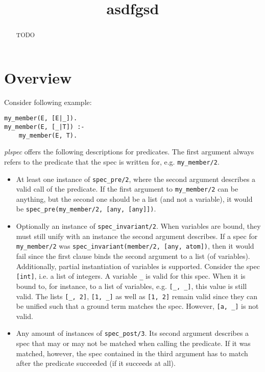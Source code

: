 \documentclass{article}
\title{asdfgsd}
\begin{document}
\maketitle

\begin{abstract}
TODO
\end{abstract}

\section{Overview}

Consider following example:

\begin{verbatim}
my_member(E, [E|_]).
my_member(E, [_|T]) :-
    my_member(E, T).
\end{verbatim}

\emph{plspec} offers the following descriptions for predicates.
The first argument always refers to the predicate that the spec is written for,
e.g. \verb|my_member/2|.

\begin{itemize}
    \item
        At least one instance of \verb|spec_pre/2|,
        where the second argument describes a valid call of the predicate.
        If the first argument to \verb|my_member/2| can be anything,
        but the second one should be a list (and not a variable),
        it would be \verb|spec_pre(my_member/2, [any, [any]])|.

    \item
        Optionally an instance of \verb|spec_invariant/2|.
        When variables are bound,
        they must still unify with an instance the second argument describes.
        If a spec for \verb|my_member/2| was
        \verb|spec_invariant(member/2, [any, atom])|,
        then it would fail since the first clause
        binds the second argument to a list (of variables).
        Additionally, partial instantiation of variables is supported.
        Consider the spec \verb|[int]|, i.e. a list of integers.
        A variable \verb|_| is valid for this spec.
        When it is bound to, for instance, to a list of variables,
        e.g. \verb|[_, _]|, this value is still valid.
        The lists \verb|[_, 2]|, \verb|[1, _]| as well as \verb|[1, 2]|
        remain valid since they can be unified such that a ground term matches the spec.
        However, \verb|[a, _]| is not valid.

    \item
        Any amount of instances of \verb|spec_post/3|.
        Its second argument describes a spec
        that may or may not be matched when calling the predicate.
        If it was matched, however, the spec contained in the third argument
        has to match after the predicate succeeded (if it succeeds at all).

\end{itemize}
\end{document}
